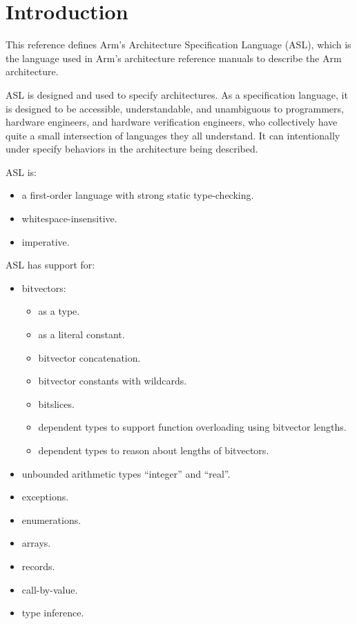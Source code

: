 \newcommand{\definitiontests}{../tests/ASLDefinition.t/}
\chapter{Introduction\label{chap:Introduction}}

This reference defines Arm’s Architecture Specification Language (ASL), which is the language
used in Arm’s architecture reference manuals to describe the Arm architecture.

ASL is designed and used to specify architectures. As a specification language, it is designed to be accessible,
understandable, and unambiguous to programmers, hardware
engineers, and hardware verification engineers, who collectively have quite a small intersection of languages they
all understand. It can intentionally under specify behaviors in the architecture being described.

ASL is:
\begin{itemize}
    \item a first-order language with strong static type-checking.
    \item whitespace-insensitive.
    \item imperative.
\end{itemize}

ASL has support for:
\begin{itemize}
    \item bitvectors:
    \begin{itemize}
        \item as a type.
        \item as a literal constant.
        \item bitvector concatenation.
        \item bitvector constants with wildcards.
        \item bitslices.
        \item dependent types to support function overloading using bitvector lengths.
        \item dependent types to reason about lengths of bitvectors.
    \end{itemize}
    \item unbounded arithmetic types “integer” and “real”.
    \item exceptions.
    \item enumerations.
    \item arrays.
    \item records.
    \item call-by-value.
    \item type inference.
\end{itemize}

